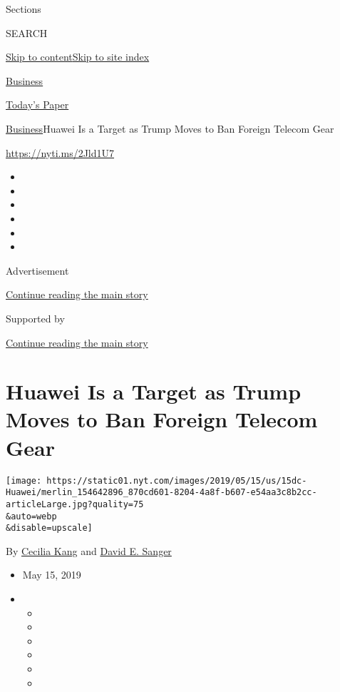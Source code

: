 Sections

SEARCH

\protect\hyperlink{site-content}{Skip to
content}\protect\hyperlink{site-index}{Skip to site index}

\href{https://www.nytimes.com/section/business}{Business}

\href{https://myaccount.nytimes.com/auth/login?response_type=cookie\&client_id=vi}{}

\href{https://www.nytimes.com/section/todayspaper}{Today's Paper}

\href{/section/business}{Business}\textbar{}Huawei Is a Target as Trump
Moves to Ban Foreign Telecom Gear

\url{https://nyti.ms/2Jld1U7}

\begin{itemize}
\item
\item
\item
\item
\item
\item
\end{itemize}

Advertisement

\protect\hyperlink{after-top}{Continue reading the main story}

Supported by

\protect\hyperlink{after-sponsor}{Continue reading the main story}

\hypertarget{huawei-is-a-target-as-trump-moves-to-ban-foreign-telecom-gear}{%
\section{Huawei Is a Target as Trump Moves to Ban Foreign Telecom
Gear}\label{huawei-is-a-target-as-trump-moves-to-ban-foreign-telecom-gear}}

\texttt{[image: https://static01.nyt.com/images/2019/05/15/us/15dc-Huawei/merlin\_154642896\_870cd601-8204-4a8f-b607-e54aa3c8b2cc-articleLarge.jpg?quality=75\\\&auto=webp\\\&disable=upscale]}

By \href{https://www.nytimes.com/by/cecilia-kang}{Cecilia Kang} and
\href{https://www.nytimes.com/by/david-e-sanger}{David E. Sanger}

\begin{itemize}
\item
  May 15, 2019
\item
  \begin{itemize}
  \item
  \item
  \item
  \item
  \item
  \item
  \end{itemize}
\end{itemize}

